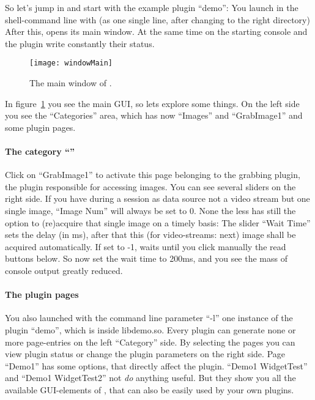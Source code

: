 So let's jump in and start \icewing{} with the example plugin ``demo'': 
You launch \icewing{} in the shell-command line with (as one single
line, after changing to the right directory)
\sS
{}
\sE
After this, \icewing{} opens its main window. At the same time on
the starting console \icewing{} and the plugin write constantly 
their status.

\begin{figure}[h]
  \begin {center}
    \texttt{[image: windowMain]}
    \caption{The main window of \icewing{}.}
    \label{fig:windowMain}
  \end{center}
\end{figure}

In figure~\ref{fig:windowMain} you see the \icewing{} main GUI, so lets
explore some things. On the left side you see the ``Categories''
area, which has now ``Images'' and ``GrabImage1'' and some plugin pages.

\paragraph{The category ``''}

Click on ``GrabImage1'' to activate this page belonging to the
grabbing plugin, the plugin responsible for accessing images. You
can see several sliders on the right side. If you have during a
session as data source not a video stream but one single image,
``Image Num'' will always be set to 0. None the less \icewing{} has
still the option to (re)acquire that single image on a timely basis:
The slider ``Wait Time'' sets the delay (in ms), after that this
(for video-streams: next) image shall be acquired automatically. If
set to -1, \icewing{} waits until you click manually the read
buttons below. So now set the wait time to 200ms, and you see the
mass of console output greatly reduced.

\paragraph{The plugin pages}

You also launched with the command line parameter ``-l'' one
instance of the plugin ``demo'', which is inside libdemo.so. Every
plugin can generate none or more page-entries on the left
``Category'' side. By selecting the pages you can view plugin status
or change the plugin parameters on the right side. Page ``Demo1''
has some options, that directly affect the plugin. ``Demo1
WidgetTest'' and ``Demo1 WidgetTest2'' not {\em do} anything
useful. But they show you all the available GUI-elements of
\icewing{}, that can also be easily used by your own plugins.

